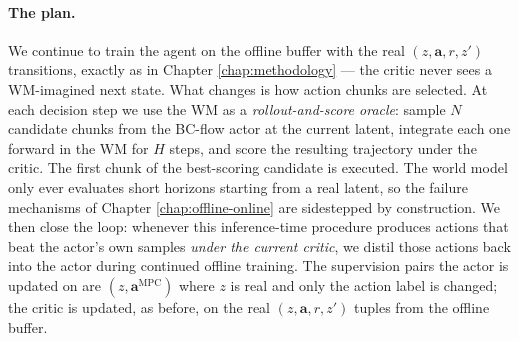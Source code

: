 \paragraph{The plan.} We continue to train the agent on the offline buffer with the real $(z, \mathbf{a}, r, z')$ transitions, exactly as in Chapter \ref{chap:methodology} --- the critic never sees a WM-imagined next state. What changes is how action chunks are selected. At each decision step we use the WM as a \emph{rollout-and-score oracle}: sample $N$ candidate chunks from the BC-flow actor at the current latent, integrate each one forward in the WM for $H$ steps, and score the resulting trajectory under the critic. The first chunk of the best-scoring candidate is executed. The world model only ever evaluates short horizons starting from a real latent, so the failure mechanisms of Chapter \ref{chap:offline-online} are sidestepped by construction. We then close the loop: whenever this inference-time procedure produces actions that beat the actor's own samples \emph{under the current critic}, we distil those actions back into the actor during continued offline training. The supervision pairs the actor is updated on are $(z, \mathbf{a}^{\text{MPC}})$ where $z$ is real and only the action label is changed; the critic is updated, as before, on the real $(z, \mathbf{a}, r, z')$ tuples from the offline buffer.

